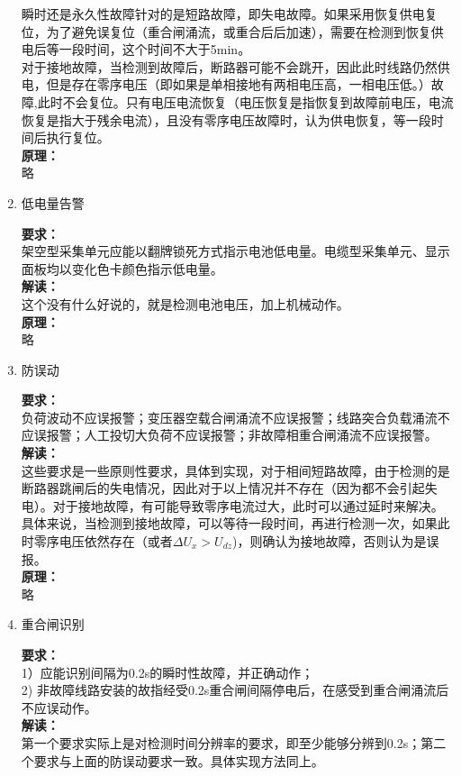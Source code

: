 \documentclass{article}
\begin{document}
\begin{CJK}{UTF8}{gbsn}
\begin{enumerate}
	瞬时还是永久性故障针对的是短路故障，即失电故障。如果采用恢复供电复位，为了避免误复位（重合闸涌流，或重合后后加速），需要在检测到恢复供电后等一段时间，这个时间不大于5min。\\
	对于接地故障，当检测到故障后，断路器可能不会跳开，因此此时线路仍然供电，但是存在零序电压（即如果是单相接地有两相电压高，一相电压低。）故障,此时不会复位。只有电压电流恢复（电压恢复是指恢复到故障前电压，电流恢复是指大于残余电流），且没有零序电压故障时，认为供电恢复，等一段时间后执行复位。\\
	\textbf{原理：}\\
	略

\item 低电量告警
	\par
	\textbf{要求：}\\
	架空型采集单元应能以翻牌锁死方式指示电池低电量。电缆型采集单元、显示面板均以变化色卡颜色指示低电量。\\
	\textbf{解读：}\\
	这个没有什么好说的，就是检测电池电压，加上机械动作。\\
	\textbf{原理：}\\
	略
\item 防误动
	\par
	\textbf{要求：}\\
	负荷波动不应误报警；变压器空载合闸涌流不应误报警；线路突合负载涌流不应误报警；人工投切大负荷不应误报警；非故障相重合闸涌流不应误报警。\\
	\textbf{解读：}\\
	这些要求是一些原则性要求，具体到实现，对于相间短路故障，由于检测的是断路器跳闸后的失电情况，因此对于以上情况并不存在（因为都不会引起失电）。对于接地故障，有可能导致零序电流过大，此时可以通过延时来解决。具体来说，当检测到接地故障，可以等待一段时间，再进行检测一次，如果此时零序电压依然存在（或者$\Delta U_x>U_{dz}$)，则确认为接地故障，否则认为是误报。\\
	\textbf{原理：}\\
	略
\item 重合闸识别
	\par
	\textbf{要求：}\\
	1）应能识别间隔为0.2s的瞬时性故障，并正确动作；\\
	2) 非故障线路安装的故指经受0.2s重合闸间隔停电后，在感受到重合闸涌流后不应误动作。\\
	\textbf{解读：}\\
	第一个要求实际上是对检测时间分辨率的要求，即至少能够分辨到0.2s；第二个要求与上面的防误动要求一致。具体实现方法同上。\\

\end{enumerate}
\end{CJK}
\end{document}
